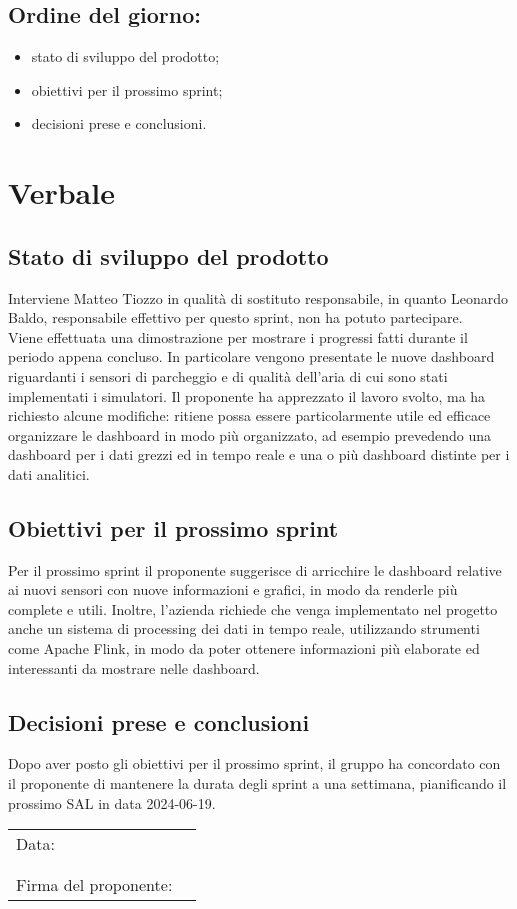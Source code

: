 \documentclass[italian,12pt]{article}
\begin{document}
\subsection*{Ordine del giorno:}
\begin{itemize}
	\item stato di sviluppo del prodotto;
	\item obiettivi per il prossimo sprint;
	\item decisioni prese e conclusioni.
\end{itemize}

\newpage

\section{Verbale}

\subsection{Stato di sviluppo del prodotto}
Interviene Matteo Tiozzo in qualità di sostituto responsabile, in quanto Leonardo Baldo, responsabile effettivo per questo sprint, non ha potuto partecipare. \\
Viene effettuata una dimostrazione per mostrare i progressi fatti durante il periodo appena concluso. In particolare vengono presentate le nuove dashboard riguardanti i sensori di parcheggio e di qualità dell'aria di cui sono stati implementati i simulatori. Il proponente ha apprezzato il lavoro svolto, ma ha richiesto alcune modifiche: ritiene possa essere particolarmente utile ed efficace organizzare le dashboard in modo più organizzato, ad esempio prevedendo una dashboard per i dati grezzi ed in tempo reale e una o più dashboard distinte per i dati analitici.\\

\subsection{Obiettivi per il prossimo sprint}
Per il prossimo sprint il proponente suggerisce di arricchire le dashboard relative ai nuovi sensori con nuove informazioni e grafici, in modo da renderle più complete e utili. Inoltre, l'azienda richiede che venga implementato nel progetto anche un sistema di processing dei dati in tempo reale, utilizzando strumenti come Apache Flink, in modo da poter ottenere informazioni più elaborate ed interessanti da mostrare nelle dashboard.

\subsection{Decisioni prese e conclusioni}
Dopo aver posto gli obiettivi per il prossimo sprint, il gruppo ha concordato con il proponente di mantenere la durata degli sprint a una settimana, pianificando il prossimo SAL in data 2024-06-19.


\newpage
\begin{table}[b]
	\begin{tabular}{@{}p{5cm}p{10cm}@{}}
		Data:                 & \hrulefill \\
		                      &            \\
		                      &            \\
		Firma del proponente: & \hrulefill \\
	\end{tabular}
\end{table}
\end{document}
